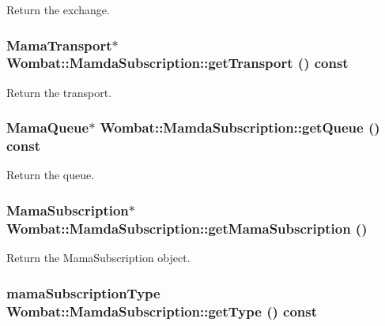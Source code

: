 Return the exchange. 

\hypertarget{classWombat_1_1MamdaSubscription_90ee867ad6306beb8327121db2379988}{
\subsubsection[getTransport]{\setlength{\rightskip}{0pt plus 5cm}Mama\-Transport$\ast$ Wombat::Mamda\-Subscription::get\-Transport () const}}
\label{classWombat_1_1MamdaSubscription_90ee867ad6306beb8327121db2379988}


Return the transport. 

\hypertarget{classWombat_1_1MamdaSubscription_8129a93c8b810dc9f7cf53c4c10afd49}{
\subsubsection[getQueue]{\setlength{\rightskip}{0pt plus 5cm}Mama\-Queue$\ast$ Wombat::Mamda\-Subscription::get\-Queue () const}}
\label{classWombat_1_1MamdaSubscription_8129a93c8b810dc9f7cf53c4c10afd49}


Return the queue. 

\hypertarget{classWombat_1_1MamdaSubscription_fd44aa9380bd377b2934ccd64c58cfad}{
\subsubsection[getMamaSubscription]{\setlength{\rightskip}{0pt plus 5cm}Mama\-Subscription$\ast$ Wombat::Mamda\-Subscription::get\-Mama\-Subscription ()}}
\label{classWombat_1_1MamdaSubscription_fd44aa9380bd377b2934ccd64c58cfad}


Return the Mama\-Subscription object. 

\hypertarget{classWombat_1_1MamdaSubscription_f6d6a708aa79d28640efaf31a80d05e7}{
\subsubsection[getType]{\setlength{\rightskip}{0pt plus 5cm}mama\-Subscription\-Type Wombat::Mamda\-Subscription::get\-Type () const}}
\label{classWombat_1_1MamdaSubscription_f6d6a708aa79d28640efaf31a80d05e7}


